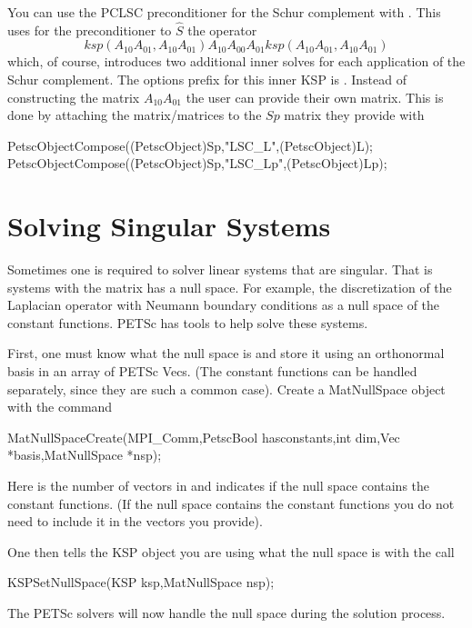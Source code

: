 You can use the PCLSC preconditioner for the Schur complement with . This uses for the preconditioner to $\hat{S}$ the operator 
\[
 ksp(A_{10} A_{01},A_{10} A_{01}) A_{10} A_{00} A_{01} ksp(A_{10} A_{01},A_{10} A_{01}) 
\]
 which, of course, introduces two additional inner solves for each application of the Schur complement. The options prefix for this inner KSP is . Instead of constructing the matrix $A_{10} A_{01}$ the user can provide their own matrix. This is done by attaching the matrix/matrices to the $ Sp $ matrix they provide with
\begin{tabbing}
 PetscObjectCompose((PetscObject)Sp,"LSC\_L",(PetscObject)L); \\
 PetscObjectCompose((PetscObject)Sp,"LSC\_Lp",(PetscObject)Lp);
\end{tabbing}

\section{Solving Singular Systems}
\label{sec_singular}

Sometimes one is required to solver linear systems that are singular. 
That is systems with the matrix has a null space. For example, the 
discretization of the Laplacian operator with Neumann boundary conditions
as a null space of the constant functions. PETSc has tools to help
solve these systems.

First, one must know what the null space is and store it using an orthonormal basis 
in an array of PETSc Vecs. (The constant functions can be handled separately, since
they are such a common case). Create a MatNullSpace object with the command
\begin{tabbing}
MatNullSpaceCreate(MPI\_Comm,PetscBool  hasconstants,int dim,Vec *basis,MatNullSpace *nsp);
\end{tabbing}
Here  is the number of vectors in  and  indicates
if the null space contains the constant functions. (If the null space contains the constant
functions you do not need to include it in the  vectors you provide).

One then tells the KSP object you are using what the null space is with the call
\begin{tabbing}
KSPSetNullSpace(KSP ksp,MatNullSpace nsp);
\end{tabbing}
The PETSc solvers will now handle the null space during the solution process.

